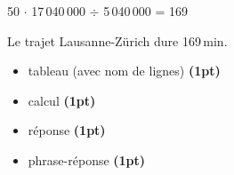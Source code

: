 \begin{parts}
\begin{solutionorgrid}[140pt]
	\vspace{10pt}
	50 $\cdot$ 17\,040\,000 $\div$ 5\,040\,000 = 169
	
	\vspace{10pt}
	Le trajet Lausanne-Zürich dure 169\,min.
	
	\vspace{10pt}
	\begin{itemize}
	\item tableau (avec nom de lignes) \textbf{(1pt)}
	\item calcul \textbf{(1pt)}
	\item réponse \textbf{(1pt)}
	\item phrase-réponse \textbf{(1pt)}
	\end{itemize}
	\end{solutionorgrid}
\end{parts}

